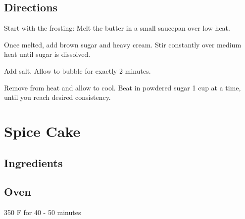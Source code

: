 \documentclass[ansiapaper,10pt,english]{sphinxmanual}
\begin{document}
\section{Directions}
\label{\detokenize{Salted_Caramel_Frosting:directions}}
Start with the frosting: Melt the butter in a small saucepan over low heat.

Once melted, add brown sugar and heavy cream. Stir constantly over medium heat until sugar is dissolved.

Add salt. Allow to bubble for exactly 2 minutes.

Remove from heat and allow to cool. Beat in powdered sugar 1 cup at a time, until you reach desired consistency.


\chapter{Spice Cake}
\label{\detokenize{spice_cake:spice-cake}}\label{\detokenize{spice_cake::doc}}

\section{Ingredients}
\label{\detokenize{spice_cake:ingredients}}
%
\begin{sphinxVerbatim}[commandchars=\\\{\}]
   

    

  

  

 

  

  
\end{sphinxVerbatim}


%
\begin{sphinxVerbatim}[commandchars=\\\{\}]
  

  
\end{sphinxVerbatim}


\section{Oven}
\label{\detokenize{spice_cake:oven}}
350 F for 40 - 50 minutes
\end{document}
